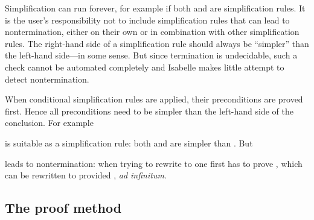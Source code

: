 \begin{isabellebody}
\begin{isamarkuptext}
Simplification can run forever, for example if both  and
 are simplification rules. It is the user's
responsibility not to include simplification rules that can lead to
nontermination, either on their own or in combination with other
simplification rules. The right-hand side of a simplification rule should
always be ``simpler'' than the left-hand side---in some sense. But since
termination is undecidable, such a check cannot be automated completely
and Isabelle makes little attempt to detect nontermination.

When conditional simplification rules are applied, their preconditions are
proved first. Hence all preconditions need to be
simpler than the left-hand side of the conclusion. For example
\begin{quote}
\end{quote}
is suitable as a simplification rule: both  and 
are simpler than \mbox{}. But
\begin{quote}
\end{quote}
leads to nontermination: when trying to rewrite  to 
one first has to prove \mbox{}, which can be rewritten to  provided , \emph{ad infinitum}.

\subsection{The  proof method}
\label{sec:simp}


\end{isamarkuptext}
\end{isabellebody}
